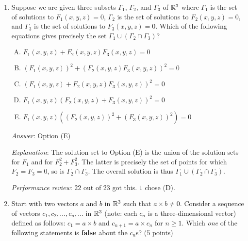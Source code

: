 \documentclass[10pt]{amsart}
\begin{document}
\begin{enumerate}
  {\em Answer}: Option (B)

  {\em Explanation}: Option (B) involves a sum of two squares being
  zero, so both the things being squared must equal zero. Thus,
  $F_1(x,y,z) = 0$ and $F_2(x,y,z)F_3(x,y,z) = 0$. The solution set to
  the latter is the union of the solution sets for $F_2$ and $F_3$, so
  is $\Gamma_2 \cup \Gamma_3$. So the overall solution set is
  $\Gamma_1 \cap (\Gamma_2 \cup \Gamma_3)$.

  {\em Performance review}: All $23$ got this correct.

\item Suppose we are given three subsets $\Gamma_1$, $\Gamma_2$, and
  $\Gamma_3$ of $\mathbb{R}^3$ where $\Gamma_1$ is the set of solutions to
  $F_1(x,y,z) = 0$, $\Gamma_2$ is the set of solutions to $F_2(x,y,z)
  = 0$, and $\Gamma_3$ is the set of solutions to $F_3(x,y,z) =
  0$. Which of the following equations gives precisely the set
  $\Gamma_1 \cup (\Gamma_2 \cap \Gamma_3)$?

  \begin{enumerate}[(A)]
  \item $F_1(x,y,z) + F_2(x,y,z)F_3(x,y,z) = 0$
  \item $(F_1(x,y,z))^2 + (F_2(x,y,z)F_3(x,y,z))^2 = 0$
  \item $(F_1(x,y,z) + F_2(x,y,z)F_3(x,y,z))^2 = 0$
  \item $F_1(x,y,z)(F_2(x,y,z) + F_3(x,y,z))^2 = 0$
  \item $F_1(x,y,z)((F_2(x,y,z))^2 + (F_3(x,y,z))^2) = 0$
  \end{enumerate}

  {\em Answer}: Option (E)

  {\em Explanation}: The solution set to Option (E) is the union of
  the solution sets for $F_1$ and for $F_2^2 + F_3^2$. The latter is
  precisely the set of points for which $F_2 = F_3 = 0$, so is
  $\Gamma_2 \cap \Gamma_3$. The overall solution is thus $\Gamma_1
  \cup (\Gamma_2 \cap \Gamma_3)$.

  {\em Performance review}: $22$ out of $23$ got this. $1$ chose (D).

\item Start with two vectors $a$ and $b$ in $\mathbb{R}^3$ such that $a \times
  b \ne 0$. Consider a sequence of vectors $c_1, c_2, \dots, c_n,
  \dots$ in $\mathbb{R}^3$ (note: each $c_n$ is a three-dimensional vector)
  defined as follows: $c_1 = a \times b$ and $c_{n+1} = a \times c_n$
  for $n \ge 1$. Which {\em one} of the following statements is {\bf
  false} about the $c_n$s? (5 points)


\end{enumerate}
\end{document}

